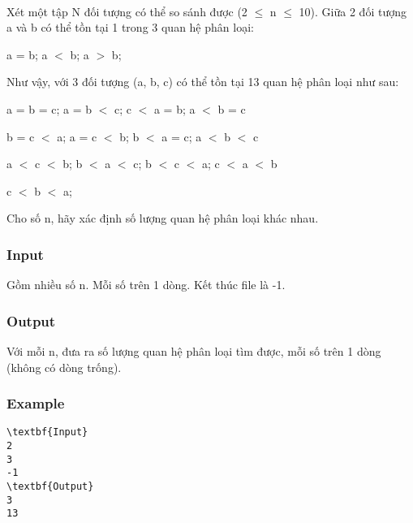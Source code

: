 

 

Xét một tập N đối tượng có thể so sánh được (2 $\le$ n $\le$ 10). Giữa 2 đối tượng a và b có thể tồn tại 1 trong 3 quan hệ phân loại:

a = b; a $<$ b; a $>$ b;

Như vậy, với 3 đối tượng (a, b, c) có thể tồn tại 13 quan hệ phân loại như sau:

a = b = c; a = b $<$ c; c $<$ a = b; a $<$ b = c


b = c $<$ a; a = c $<$ b; b $<$ a = c; a $<$ b $<$ c


a $<$ c $<$ b; b $<$ a $<$ c; b $<$ c $<$ a; c $<$ a $<$ b


c $<$ b $<$ a;

Cho số n, hãy xác định số lượng quan hệ phân loại khác nhau.

\subsubsection{Input}

Gồm nhiều số n. Mỗi số trên 1 dòng. Kết thúc file là -1.

\subsubsection{Output}

Với mỗi n, đưa ra số lượng quan hệ phân loại tìm được, mỗi số trên 1 dòng (không có dòng trống).

\subsubsection{Example}
\begin{verbatim}
\textbf{Input}
2
3
-1
\textbf{Output}
3
13
\end{verbatim}
